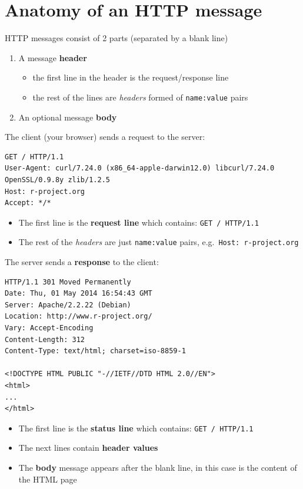 \documentclass[
]{book}
\providecommand{\tightlist}{%
  \setlength{\itemsep}{0pt}\setlength{\parskip}{0pt}}
\begin{document}
\hypertarget{anatomy-of-an-http-message}{%
\section{Anatomy of an HTTP message}\label{anatomy-of-an-http-message}}

HTTP messages consist of 2 parts (separated by a blank line)

\begin{enumerate}
\def\labelenumi{\arabic{enumi})}
\tightlist
\item
  A message \textbf{header}

  \begin{itemize}
  \tightlist
  \item
    the first line in the header is the request/response line
  \item
    the rest of the lines are \emph{headers} formed of \texttt{name:value} pairs
  \end{itemize}
\item
  An optional message \textbf{body}
\end{enumerate}

The client (your browser) sends a request to the server:

\begin{verbatim}
GET / HTTP/1.1
User-Agent: curl/7.24.0 (x86_64-apple-darwin12.0) libcurl/7.24.0 OpenSSL/0.9.8y zlib/1.2.5
Host: r-project.org
Accept: */*
\end{verbatim}

\begin{itemize}
\tightlist
\item
  The first line is the \textbf{request line} which contains: \texttt{GET\ /\ HTTP/1.1}
\item
  The rest of the \emph{headers} are just \texttt{name:value} pairs,
  e.g.~\texttt{Host:\ r-project.org}
\end{itemize}

The server sends a \textbf{response} to the client:

\begin{verbatim}
HTTP/1.1 301 Moved Permanently
Date: Thu, 01 May 2014 16:54:43 GMT
Server: Apache/2.2.22 (Debian)
Location: http://www.r-project.org/
Vary: Accept-Encoding
Content-Length: 312
Content-Type: text/html; charset=iso-8859-1
 
<!DOCTYPE HTML PUBLIC "-//IETF//DTD HTML 2.0//EN">
<html>
...
</html>
\end{verbatim}

\begin{itemize}
\tightlist
\item
  The first line is the \textbf{status line} which contains: \texttt{GET\ /\ HTTP/1.1}
\item
  The next lines contain \textbf{header values}
\item
  The \textbf{body} message appears after the blank line, in this case is the
  content of the HTML page
\end{itemize}
\end{document}
